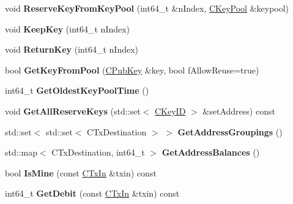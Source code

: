 \begin{DoxyCompactItemize}
\item 
\mbox{\label{class_c_wallet_a9921854840668a1856998f041177dd2b}} 
void {\bfseries Reserve\+Key\+From\+Key\+Pool} (int64\+\_\+t \&n\+Index, \mbox{\hyperlink{class_c_key_pool}{C\+Key\+Pool}} \&keypool)
\item 
\mbox{\label{class_c_wallet_ae460b8c824a1a6633615f95373e533f2}} 
void {\bfseries Keep\+Key} (int64\+\_\+t n\+Index)
\item 
\mbox{\label{class_c_wallet_a4ee5566c2b4c8f4ed5cec628573b9275}} 
void {\bfseries Return\+Key} (int64\+\_\+t n\+Index)
\item 
\mbox{\label{class_c_wallet_a9798a37f9715c5fd050fca22c67d92a4}} 
bool {\bfseries Get\+Key\+From\+Pool} (\mbox{\hyperlink{class_c_pub_key}{C\+Pub\+Key}} \&key, bool f\+Allow\+Reuse=true)
\item 
\mbox{\label{class_c_wallet_a2555a9442e58b3c5593fef21f1b39d2d}} 
int64\+\_\+t {\bfseries Get\+Oldest\+Key\+Pool\+Time} ()
\item 
\mbox{\label{class_c_wallet_aa182f6de943295062748ab42e64c9203}} 
void {\bfseries Get\+All\+Reserve\+Keys} (std\+::set$<$ \mbox{\hyperlink{class_c_key_i_d}{C\+Key\+ID}} $>$ \&set\+Address) const
\item 
\mbox{\label{class_c_wallet_a8eacbac6ad3697d90b98dfe02632f8ef}} 
std\+::set$<$ std\+::set$<$ C\+Tx\+Destination $>$ $>$ {\bfseries Get\+Address\+Groupings} ()
\item 
\mbox{\label{class_c_wallet_aadffdf5d0e2f2413cdcc2a39fc2e310d}} 
std\+::map$<$ C\+Tx\+Destination, int64\+\_\+t $>$ {\bfseries Get\+Address\+Balances} ()
\item 
\mbox{\label{class_c_wallet_a54b2373b83595e903dfc83e97fe43dfd}} 
bool {\bfseries Is\+Mine} (const \mbox{\hyperlink{class_c_tx_in}{C\+Tx\+In}} \&txin) const
\item 
\mbox{\label{class_c_wallet_ab3686e8129c0fb21fa6be8a03d43d31d}} 
int64\+\_\+t {\bfseries Get\+Debit} (const \mbox{\hyperlink{class_c_tx_in}{C\+Tx\+In}} \&txin) const

\end{DoxyCompactItemize}
